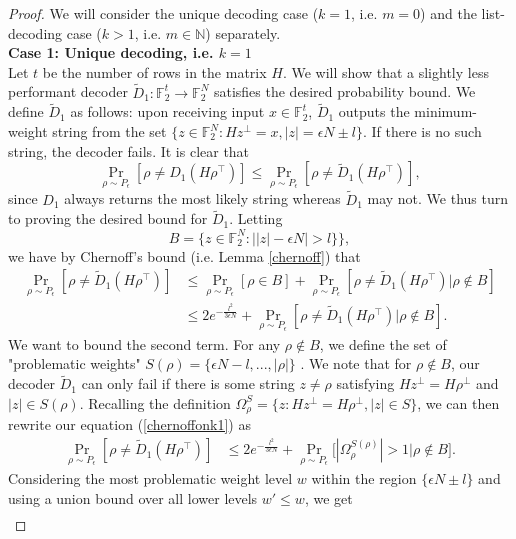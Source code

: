 \documentclass[12pt]{article}
\newcommand{\N}{\mathbb{N}}
\newcommand{\F}{\mathbb{F}}
\begin{document}
\begin{proof}
We will consider the unique decoding case ($k=1$, i.e. $m=0$) and the list-decoding case ($k>1$, i.e. $m\in\N$) separately.
\hfil\\
\textbf{Case 1: Unique decoding, i.e. $k=1$} 
\hfil\\
Let $t$ be the number of rows in the matrix $H$. We will show that a slightly less performant decoder $\tilde{D}_1:\mathbb{F}_2^t\rightarrow \mathbb{F}_2^N$ satisfies the desired probability bound. We define $\tilde{D}_{1}$ as follows: upon receiving input $x\in\mathbb{F}_2^t$, $\tilde{D}_1$ outputs the minimum-weight string from the set $\{z\in\F_2^N:Hz^\perp=x,|z|=\epsilon N\pm l\}.$
If there is no such string, the decoder fails. It is clear that
$$\Pr_{\rho\sim P_\epsilon}[ \rho\neq D_{1}(H\rho^\intercal)]\leq \Pr_{\rho\sim P_\epsilon}[ \rho\neq \tilde{D}_1(H\rho^\intercal)],$$
since $D_1$ always returns the most likely string whereas $\tilde{D}_1$ may not.
We thus turn to proving the desired bound for $\tilde{D}_{1}$. Letting
$$B=\{z\in\mathbb{F}_2^N:\big||z|-\epsilon N\big|>l\}\},$$
we have by Chernoff's bound (i.e. Lemma \ref{chernoff}) that
\begin{align}\label{chernoffonk1}
    \Pr_{\rho\sim P_\epsilon}[ \rho\neq \tilde{D}_{1}(H\rho^\intercal)]&\leq \Pr_{\rho\sim P_\epsilon}[\rho\in B]+\Pr_{\rho\sim P_\epsilon}[ \rho\neq \tilde{D}_{1}(H\rho^\intercal)\big|\rho\notin B]\nonumber\\
    &\leq 2e^{-\frac{l^2}{3\epsilon N}} +\Pr_{\rho\sim P_\epsilon}[ \rho\neq \tilde{D}_{1}(H\rho^\intercal)\big|\rho\notin B].
\end{align}
We want to bound the second term. For any $\rho\notin B$, we define the set of "problematic weights" $S(\rho)=\{\epsilon N-l,...,|\rho|\}$ . We note that for $\rho\notin B$, our decoder $\tilde{D}_{1}$ can only fail if there is some string $z\neq \rho$ satisfying $Hz^\perp=H\rho^\perp$ and $|z|\in S(\rho)$. Recalling the definition $\Omega_\rho^S=\{z:Hz^\perp=H\rho^\perp, |z|\in S\}$, we can then rewrite our equation (\ref{chernoffonk1}) as
\begin{align*}    
    \Pr_{\rho\sim P_\epsilon}[ \rho\neq \tilde{D}_{1}(H\rho^\intercal)]&\leq 2e^{-\frac{l^2}{3\epsilon N}}+\Pr_{\rho\sim P_\epsilon}\big[ |\Omega_\rho^{S(\rho)}|>1 \big|\rho\notin B \big].
\end{align*}
Considering the most problematic weight level $w$ within the region $\{\epsilon N\pm l\}$ and using a union bound over all lower levels $w'\leq w$, we get
\begin{align*}

\end{align*}
\end{proof}
\end{document}
